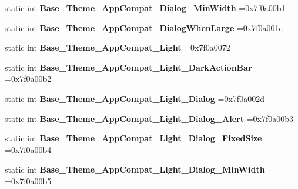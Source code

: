 \begin{DoxyCompactItemize}
static int {\bfseries Base\+\_\+\+Theme\+\_\+\+App\+Compat\+\_\+\+Dialog\+\_\+\+Min\+Width} =0x7f0a00b1
\item 
\mbox{\label{classandroid_1_1support_1_1v4_1_1R_1_1style_a44d335e6bf210c6057514aa6991a2dfd}} 
static int {\bfseries Base\+\_\+\+Theme\+\_\+\+App\+Compat\+\_\+\+Dialog\+When\+Large} =0x7f0a001c
\item 
\mbox{\label{classandroid_1_1support_1_1v4_1_1R_1_1style_ab67598b101a315fee64c9d87472cda09}} 
static int {\bfseries Base\+\_\+\+Theme\+\_\+\+App\+Compat\+\_\+\+Light} =0x7f0a0072
\item 
\mbox{\label{classandroid_1_1support_1_1v4_1_1R_1_1style_a98daae2b0ef726227ad3ffa34148e4b6}} 
static int {\bfseries Base\+\_\+\+Theme\+\_\+\+App\+Compat\+\_\+\+Light\+\_\+\+Dark\+Action\+Bar} =0x7f0a00b2
\item 
\mbox{\label{classandroid_1_1support_1_1v4_1_1R_1_1style_ac465a203f41525aa36c04d3ea70365d0}} 
static int {\bfseries Base\+\_\+\+Theme\+\_\+\+App\+Compat\+\_\+\+Light\+\_\+\+Dialog} =0x7f0a002d
\item 
\mbox{\label{classandroid_1_1support_1_1v4_1_1R_1_1style_a92ba541accf758867d1cf3baabd676ad}} 
static int {\bfseries Base\+\_\+\+Theme\+\_\+\+App\+Compat\+\_\+\+Light\+\_\+\+Dialog\+\_\+\+Alert} =0x7f0a00b3
\item 
\mbox{\label{classandroid_1_1support_1_1v4_1_1R_1_1style_abdb883db274f754b87dca5be8b274a35}} 
static int {\bfseries Base\+\_\+\+Theme\+\_\+\+App\+Compat\+\_\+\+Light\+\_\+\+Dialog\+\_\+\+Fixed\+Size} =0x7f0a00b4
\item 
\mbox{\label{classandroid_1_1support_1_1v4_1_1R_1_1style_a01beebb9942f1abaf35481f37f12c6e3}} 
static int {\bfseries Base\+\_\+\+Theme\+\_\+\+App\+Compat\+\_\+\+Light\+\_\+\+Dialog\+\_\+\+Min\+Width} =0x7f0a00b5
\item 
\mbox{\label{classandroid_1_1support_1_1v4_1_1R_1_1style_ad0052c660dc8bb4c7440bafe173c3234}} 

\end{DoxyCompactItemize}

